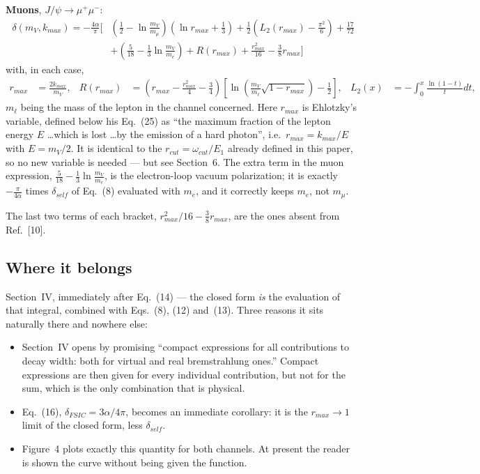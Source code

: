 \documentclass[11pt]{article}
\begin{document}
\textbf{Muons}, $J/\psi\to\mu^+\mu^-$:
\begin{equation*}
\boxed{\;
\begin{aligned}
\delta(m_V,k_{max})=-\frac{4\alpha}{\pi}
\Bigg[&
\left(\frac12-\ln\frac{m_V}{m_\mu}\right)\left(\ln r_{max}+\frac13\right)
+\frac12\left(L_2(r_{max})-\frac{\pi^{2}}{6}\right)
+\frac{17}{72}\\[2pt]
&+\left(\frac{5}{18}-\frac13\ln\frac{m_V}{m_e}\right)
+R(r_{max})
+\frac{r_{max}^{2}}{16}-\frac{3}{8}r_{max}
\Bigg]
\end{aligned}
\;}
\end{equation*}
with, in each case,
\begin{align*}
r_{max}&=\frac{2k_{max}}{m_V}, &
R(r_{max})&=\left(r_{max}-\frac{r_{max}^{2}}{4}-\frac34\right)
\left[\ln\!\left(\frac{m_V}{m_\ell}\sqrt{1-r_{max}}\right)-\frac12\right], &
L_2(x)&=-\int_0^x\frac{\ln(1-t)}{t}dt,
\end{align*}
$m_\ell$ being the mass of the lepton in the channel concerned. Here $r_{max}$
is Ehlotzky's variable, defined below his Eq.~(25) as ``the maximum fraction of
the lepton energy $E$ \ldots which is lost \ldots by the emission of a hard
photon'', i.e.\ $r_{max}=k_{max}/E$ with $E=m_V/2$. It is identical to the
$r_{cut}=\omega_{cut}/E_1$ already defined in this paper, so no new variable is
needed --- but see Section~6. The extra term
in the muon expression, $\frac{5}{18}-\frac13\ln\frac{m_V}{m_e}$, is the
electron-loop vacuum polarization; it is exactly $-\frac{\pi}{4\alpha}$ times
$\delta_{self}$ of Eq.~(8) evaluated with $m_e$, and it correctly keeps $m_e$,
not $m_\mu$.

The last two terms of each bracket, $r_{max}^{2}/16-\tfrac38 r_{max}$, are the
ones absent from Ref.~[10].

\subsection*{Where it belongs}

Section~IV, immediately after Eq.~(14) --- the closed form \emph{is} the
evaluation of that integral, combined with Eqs.~(8), (12) and~(13). Three
reasons it sits naturally there and nowhere else:

\begin{itemize}
\item Section~IV opens by promising ``compact expressions for all contributions
      to decay width: both for virtual and real bremstrahlung ones.'' Compact
      expressions are then given for every individual contribution, but not for
      the sum, which is the only combination that is physical.
\item Eq.~(16), $\delta_{FSIC}=3\alpha/4\pi$, becomes an immediate corollary: it
      is the $r_{max}\to1$ limit of the closed form, less $\delta_{self}$.
\item Figure~4 plots exactly this quantity for both channels. At present the
      reader is shown the curve without being given the function.
\end{itemize}
\end{document}
